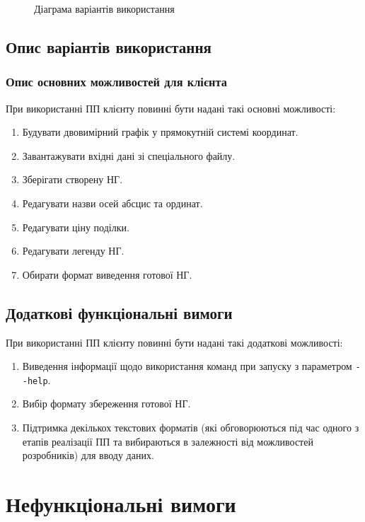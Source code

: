 \documentclass[a4paper,oneside,DIV=12,12pt]{scrartcl}
\begin{document}
		\begin{figure}[!htbp]
		\centering
		\caption{Діаграма варіантів використання}
		\label{fig:client-use-case-diagram}
		\end{figure}

		\subsection{Опис варіантів використання}
			\label{ssec:use-case-description}

		\subsubsection{Опис основних можливостей для клієнта}
		
			При використанні ПП клієнту повинні бути надані такі основні можливості:
			\begin{enumerate}
				\item Будувати двовимірний графік у прямокутній системі координат.
				\item Завантажувати вхідні дані зі спеціального файлу.
				\item Зберігати створену НГ.
				\item Редагувати назви осей абсцис та ординат.
				\item Редагувати ціну поділки.
				\item Редагувати легенду НГ.
				\item Обирати формат виведення готової НГ.
			\end{enumerate}

		\subsection{Додаткові функціональні вимоги}
			При використанні ПП клієнту повинні бути надані такі додаткові можливості:
			\begin{enumerate}
				\item Виведення інформації щодо використання команд при запуску з параметром \verb|--help|. 
				\item Вибір формату збереження готової НГ.
				\item Підтримка декількох текстових форматів (які обговорюються під час одного з етапів реалізації ПП та вибираються в залежності від можливостей розробників) для вводу даних.
			\end{enumerate}

	\section{Нефункціональні вимоги}
\end{document}

